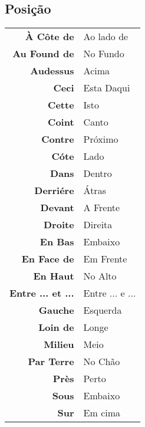 \documentclass{article}
\begin{document}
    \subsection{Posição}
        \begin{center}
            \begin{tabular}{r l}
                \textbf{À Côte de}        & Ao lado de\\
                \textbf{Au Found de}      & No Fundo\\
                \textbf{Audessus}         & Acima\\
                \textbf{Ceci}             & Esta Daqui\\
                \textbf{Cette}            & Isto\\
                \textbf{Coint}            & Canto\\
                \textbf{Contre}           & Próximo\\
                \textbf{Cóte}             & Lado\\
                \textbf{Dans}             & Dentro\\
                \textbf{Derriére}         & Átras\\
                \textbf{Devant}           & A Frente\\
                \textbf{Droite}           & Direita\\
                \textbf{En Bas}           & Embaixo\\
                \textbf{En Face de}       & Em Frente\\
                \textbf{En Haut}          & No Alto\\
                \textbf{Entre ... et ...} & Entre ... e ...\\
                \textbf{Gauche}           & Esquerda\\
                \textbf{Loin de}          & Longe\\
                \textbf{Milieu}           & Meio\\
                \textbf{Par Terre}        & No Chão\\
                \textbf{Près}             & Perto\\
                \textbf{Sous}             & Embaixo\\
                \textbf{Sur}              & Em cima\\
            \end{tabular}
        \end{center}
\end{document}
